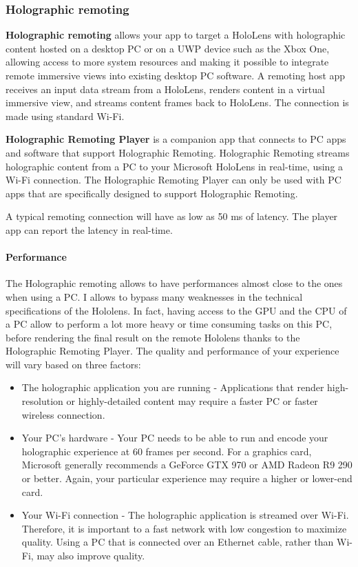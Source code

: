 \subsubsection{ Holographic remoting }

\textbf {Holographic remoting } allows your app to target a HoloLens with holographic content hosted on a desktop PC or on a UWP device such as the Xbox One, allowing access to more system resources and making it possible to integrate remote immersive views into existing desktop PC software. A remoting host app receives an input data stream from a HoloLens, renders content in a virtual immersive view, and streams content frames back to HoloLens. The connection is made using standard Wi-Fi. 

\textbf {Holographic Remoting Player} is a companion app that connects to PC apps and software that support Holographic Remoting. Holographic Remoting streams holographic content from a PC to your Microsoft HoloLens in real-time, using a Wi-Fi connection. The Holographic Remoting Player can only be used with PC apps that are specifically designed to support Holographic Remoting.

A typical remoting connection will have as low as 50 ms of latency. The player app can report the latency in real-time.

\paragraph{Performance}

The Holographic remoting allows to have performances almost close to the ones when using a PC. I allows to bypass many weaknesses in the technical specifications of the Hololens. In fact, having access to the GPU and the CPU of a PC allow to perform a lot more heavy or time consuming tasks on this PC, before rendering the final result on the remote Hololens thanks to the Holographic Remoting Player.
The quality and performance of your experience will vary based on three factors:
\begin{itemize}

\item  The holographic application you are running - Applications that render high-resolution or highly-detailed content may require a faster PC or faster wireless connection.

\item Your PC's hardware - Your PC needs to be able to run and encode your holographic experience at 60 frames per second. For a graphics card, Microsoft generally recommends a GeForce GTX 970 or AMD Radeon R9 290 or better. Again, your particular experience may require a higher or lower-end card.

\item Your Wi-Fi connection - The holographic application is streamed over Wi-Fi. Therefore, it is important to a fast network with low congestion to maximize quality. Using a PC that is connected over an Ethernet cable, rather than Wi-Fi, may also improve quality.

\end{itemize}



